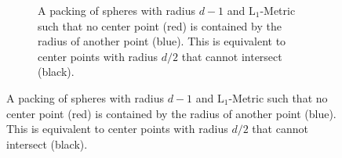 \documentclass[a4paper,12pt,headsepline]{scrartcl}
\begin{document}
\begin{figure}
\begin{subfigure}[t]{0.45\textwidth}
        \caption{A packing of spheres with radius $d-1$ and $\operatorname{L_1}$-Metric %
        such that no center point (red) is contained by the radius of another point (blue).
        This is equivalent to center points with radius $d/2$ that cannot intersect (black).%
        }%
        \label{fig:L1-radii}
        \end{subfigure}
    \end{figure}
    
\end{document}
